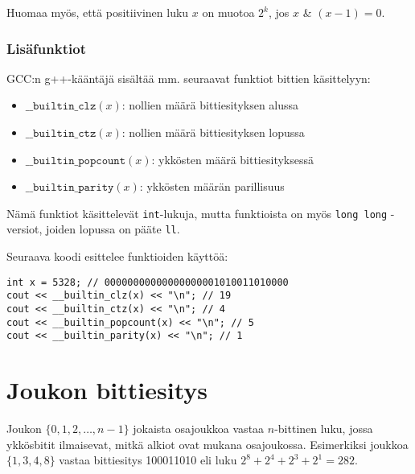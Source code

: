 Huomaa myös, että positiivinen luku $x$ on muotoa $2^k$,
jos $x$ \& $(x-1) = 0$.
% 
% 

\subsubsection*{Lisäfunktiot}

GCC:n g++-kääntäjä sisältää mm. seuraavat funktiot
bittien käsittelyyn:

\begin{itemize}
\item
$\texttt{\_\_builtin\_clz}(x)$:
nollien määrä bittiesityksen alussa
\item
$\texttt{\_\_builtin\_ctz}(x)$:
nollien määrä bittiesityksen lopussa
\item
$\texttt{\_\_builtin\_popcount}(x)$:
ykkösten määrä bittiesityksessä
\item
$\texttt{\_\_builtin\_parity}(x)$:
ykkösten määrän parillisuus
\end{itemize}

\begin{samepage}
\noindent
Nämä funktiot käsittelevät \texttt{int}-lukuja,
mutta funktioista on myös \texttt{long long} -versiot,
joiden lopussa on pääte \texttt{ll}.

Seuraava koodi esittelee funktioiden käyttöä:

\begin{lstlisting}
int x = 5328; // 00000000000000000001010011010000
cout << __builtin_clz(x) << "\n"; // 19
cout << __builtin_ctz(x) << "\n"; // 4
cout << __builtin_popcount(x) << "\n"; // 5
cout << __builtin_parity(x) << "\n"; // 1
\end{lstlisting}
\end{samepage}

\section{Joukon bittiesitys}

Joukon $\{0,1,2,\ldots,n-1\}$
jokaista osajoukkoa
vastaa $n$-bittinen luku,
jossa ykkösbitit ilmaisevat,
mitkä alkiot ovat mukana osajoukossa.
Esimerkiksi joukkoa $\{1,3,4,8\}$
vastaa bittiesitys 100011010 eli luku
$2^8+2^4+2^3+2^1=282$.

